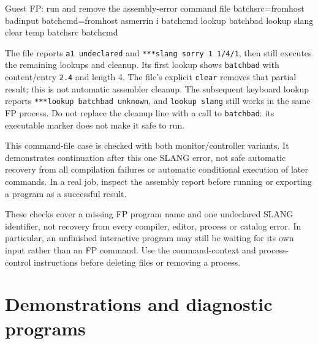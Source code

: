 \begin{commandexample}{Guest FP: run and remove the assembly-error command file}
batchsrc=fromhost badinput
batchcmd=fromhost asmerrin
i batchcmd
lookup batchbad
lookup slang
clear temp batchsrc batchcmd
\end{commandexample}

The file reports \passthrough{\lstinline!a1 undeclared!} and \passthrough{\lstinline!***slang sorry 1 1/4/1!}, then still executes the remaining lookups and cleanup. Its first lookup shows \passthrough{\lstinline!batchbad!} with content/entry \passthrough{\lstinline!2.4!} and length 4. The file's explicit \passthrough{\lstinline!clear!} removes that partial result; this is not automatic assembler cleanup. The subsequent keyboard lookup reports \passthrough{\lstinline!***lookup batchbad unknown!}, and \passthrough{\lstinline!lookup slang!} still works in the same FP process. Do not replace the cleanup line with a call to \passthrough{\lstinline!batchbad!}: its executable marker does not make it safe to run.

This command-file case is checked with both monitor/controller variants. It demonstrates continuation after this one SLANG error, not safe automatic recovery from all compilation failures or automatic conditional execution of later commands. In a real job, inspect the assembly report before running or exporting a program as a successful result.

These checks cover a missing FP program name and one undeclared SLANG identifier, not recovery from every compiler, editor, process or catalog error. In particular, an unfinished interactive program may still be waiting for its own input rather than an FP command. Use the command-context and process-control instructions before deleting files or removing a process.

\section{Demonstrations and diagnostic programs}\label{demonstrations-and-diagnostic-programs}

